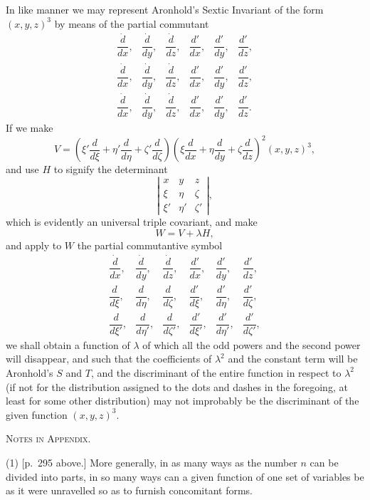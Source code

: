 \documentclass[11pt]{article}
\newcommand{\sourcepage}[1]{\marginpar{\scriptsize p.~#1}}
\begin{document}
\sourcepage{321}
In like manner we may represent Aronhold's Sextic Invariant of the form $(x,y,z)^3$ by means of the partial commutant
\[
\begin{array}{cccccc}
\dfrac{\dot d}{dx},&\dfrac{\dot d}{dy},&\dfrac{\dot d}{dz},&
\dfrac{d'}{dx},&\dfrac{d'}{dy},&\dfrac{d'}{dz},\\[0.7em]
\dfrac{\dot d}{dx},&\dfrac{\dot d}{dy},&\dfrac{\dot d}{dz},&
\dfrac{d'}{dx},&\dfrac{d'}{dy},&\dfrac{d'}{dz},\\[0.7em]
\dfrac{\dot d}{dx},&\dfrac{\dot d}{dy},&\dfrac{\dot d}{dz},&
\dfrac{d'}{dx},&\dfrac{d'}{dy},&\dfrac{d'}{dz}.
\end{array}
\]
If we make
\[
V=\left(\xi'\frac{d}{d\xi}+\eta'\frac{d}{d\eta}+\zeta'\frac{d}{d\zeta}\right)
\left(\xi\frac{d}{dx}+\eta\frac{d}{dy}+\zeta\frac{d}{dz}\right)^2(x,y,z)^3,
\]
and use $H$ to signify the determinant
\[
\left|\begin{array}{ccc}
x&y&z\\
\xi&\eta&\zeta\\
\xi'&\eta'&\zeta'
\end{array}\right|,
\]
which is evidently an universal triple covariant, and make
\[
W=V+\lambda H,
\]
and apply to $W$ the partial commutantive symbol
\[
\begin{array}{cccccc}
\dfrac{\dot d}{dx},&\dfrac{\dot d}{dy},&\dfrac{\dot d}{dz},&
\dfrac{d'}{dx},&\dfrac{d'}{dy},&\dfrac{d'}{dz},\\[0.7em]
\dfrac{d}{d\xi},&\dfrac{d}{d\eta},&\dfrac{d}{d\zeta},&
\dfrac{d'}{d\xi},&\dfrac{d'}{d\eta},&\dfrac{d'}{d\zeta},\\[0.7em]
\dfrac{d}{d\xi'},&\dfrac{d}{d\eta'},&\dfrac{d}{d\zeta'},&
\dfrac{d'}{d\xi'},&\dfrac{d'}{d\eta'},&\dfrac{d'}{d\zeta'},
\end{array}
\]
we shall obtain a function of $\lambda$ of which all the odd powers and the second power will disappear, and such that the coefficients of $\lambda^2$ and the constant term will be Aronhold's $S$ and $T$, and the discriminant of the entire function in respect to $\lambda^2$ (if not for the distribution assigned to the dots and dashes in the foregoing, at least for some other distribution) may not improbably be the discriminant of the given function $(x,y,z)^3$.

\sourcepage{322}
\begin{center}
{\scshape Notes in Appendix.}
\end{center}

(1) [p.~295 above.] More generally, in as many ways as the number $n$ can be divided into parts, in so many ways can a given function of one set of variables be as it were unravelled so as to furnish concomitant forms.
\end{document}
